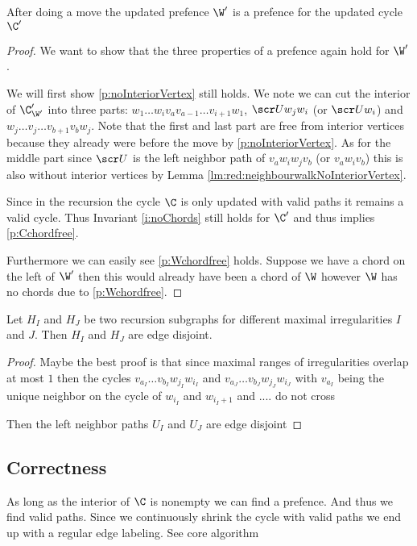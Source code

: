   \begin{lemma}
  After doing a move the updated prefence $\W'$ is a prefence for the updated cycle $\C'$
  \end{lemma}
  \begin{proof}
    We want to show that the three properties of a prefence again hold for $\W'$.

    We will first show \ref{p:noInteriorVertex} still holds.
    We note we can cut the interior of $\C'_{\W'}$ into
    three parts: $w_1 \ldots w_i v_a v_{a-1} \ldots v_{i+1} w_1$, $\U w_j w_i$ (or $\U w_i$) and $w_j \ldots v_j \ldots v_{b+1} v_b w_j$.
    Note that the first and last part are free from interior vertices because they already were before the move by \ref{p:noInteriorVertex}.
    As for the middle part since $\U$ is the left neighbor path of $v_a w_i w_j v_b$ (or $v_a w_i v_b$) this is also without interior vertices by Lemma \ref{lm:red:neighbourwalkNoInteriorVertex}.

    Since in the recursion the cycle $\C$ is only updated with valid paths it remains a valid cycle. Thus Invariant \ref{i:noChords} still holds for $\C'$ and thus implies \ref{p:Cchordfree}.

    Furthermore we can easily see \ref{p:Wchordfree} holds. Suppose we have a chord on the left of $\W'$ then this would already have been a chord of $\W$ however $\W$ has no chords due to \ref{p:Wchordfree}.
  \end{proof}

  \begin{lemma}
  Let $H_I$ and $H_J$ be two recursion subgraphs for different maximal irregularities $I$ and $J$. Then $H_I$ and $H_J$ are edge disjoint.
  \end{lemma}
  \begin{proof}
    Maybe the best proof is that since maximal ranges of irregularities overlap at most $1$ then the cycles $v_{a_I} \ldots v_{b_I} w_{j_I} w_{i_I}$  and  $v_{a_J} \ldots v_{b_J} w_{j_J} w_{i_J}$
    with $v_{a_I}$ being the unique neighbor on the cycle of $w_{i_I}$ and $w_{i_I+1}$ and ....
    do not cross

    Then the left neighbor paths $U_I$ and $U_J$ are edge disjoint


  \end{proof}

\subsection{Correctness}
  As long as the interior of $\C$ is nonempty we can find a prefence. And thus we find valid paths. Since we continuously shrink the cycle with valid paths we end up with a regular edge labeling.
  See core algorithm

